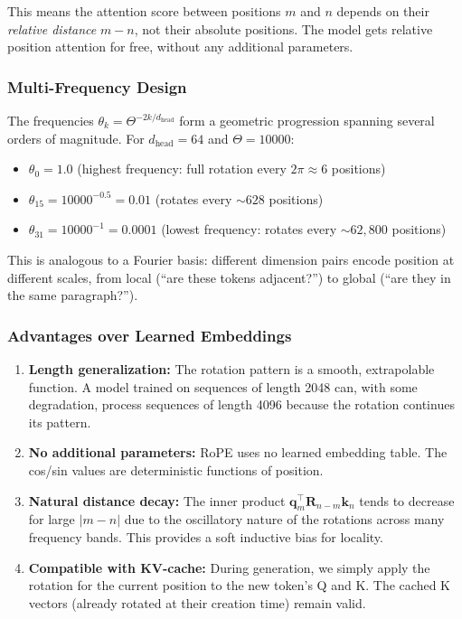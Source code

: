 \documentclass[11pt, a4paper]{article}
\theoremstyle{definition}
\newcommand{\vq}{\bm{q}}
\newcommand{\vk}{\bm{k}}
\newcommand{\mR}{\bm{R}}
\newcommand{\dhead}{d_{\text{head}}}
\begin{document}
This means the attention score between positions $m$ and $n$ depends on their \emph{relative distance} $m - n$, not their absolute positions. The model gets relative position attention for free, without any additional parameters.

\subsubsection{Multi-Frequency Design}

The frequencies $\theta_k = \Theta^{-2k/\dhead}$ form a geometric progression spanning several orders of magnitude. For $\dhead = 64$ and $\Theta = 10000$:
\begin{itemize}[nosep]
    \item $\theta_0 = 1.0$ (highest frequency: full rotation every $2\pi \approx 6$ positions)
    \item $\theta_{15} = 10000^{-0.5} = 0.01$ (rotates every $\sim 628$ positions)
    \item $\theta_{31} = 10000^{-1} = 0.0001$ (lowest frequency: rotates every $\sim 62{,}800$ positions)
\end{itemize}

This is analogous to a Fourier basis: different dimension pairs encode position at different scales, from local (``are these tokens adjacent?'') to global (``are they in the same paragraph?'').

\subsubsection{Advantages over Learned Embeddings}

\begin{enumerate}
    \item \textbf{Length generalization:} The rotation pattern is a smooth, extrapolable function. A model trained on sequences of length 2048 can, with some degradation, process sequences of length 4096 because the rotation continues its pattern.
    
    \item \textbf{No additional parameters:} RoPE uses no learned embedding table. The cos/sin values are deterministic functions of position.
    
    \item \textbf{Natural distance decay:} The inner product $\vq_m^\top \mR_{n-m} \vk_n$ tends to decrease for large $|m-n|$ due to the oscillatory nature of the rotations across many frequency bands. This provides a soft inductive bias for locality.
    
    \item \textbf{Compatible with KV-cache:} During generation, we simply apply the rotation for the current position to the new token's Q and K. The cached K vectors (already rotated at their creation time) remain valid.
\end{enumerate}
\end{document}
